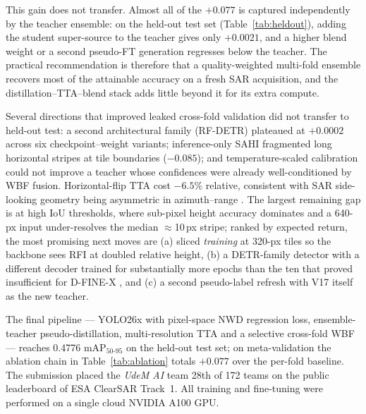 \documentclass{article}
\begin{document}
This gain does not transfer. Almost all of the $+0.077$ is captured
independently by the teacher ensemble: on the held-out test set
(Table~\ref{tab:heldout}), adding the student super-source to the
teacher gives only $+0.0021$, and a higher blend weight or a second
pseudo-FT generation regresses below the teacher. The practical
recommendation is therefore that a quality-weighted multi-fold ensemble
recovers most of the attainable accuracy on a fresh SAR acquisition,
and the distillation--TTA--blend stack adds little beyond it for its
extra compute.

Several directions that improved leaked cross-fold validation did
not transfer to held-out test: a second architectural family (RF-DETR)
plateaued at $+0.0002$ across six checkpoint--weight variants;
inference-only SAHI
fragmented long horizontal stripes at tile boundaries ($-0.085$); and
temperature-scaled calibration could not improve a teacher whose
confidences were already well-conditioned by WBF fusion.
Horizontal-flip TTA cost $-6.5\%$ relative, consistent with SAR
side-looking geometry being asymmetric in azimuth--range
\cite{oliver2004sar}. The largest remaining gap is at high IoU
thresholds, where sub-pixel height accuracy dominates and a 640-px
input under-resolves the median $\approx$10\,px stripe; ranked by
expected return, the most promising next moves are (a) sliced
\emph{training} at 320-px tiles so the backbone sees RFI at doubled
relative height, (b) a DETR-family detector with a different decoder
trained for substantially more epochs than the ten that proved
insufficient for D-FINE-X \cite{huang2024deim}, and (c) a second
pseudo-label refresh with V17 itself as the new teacher.

The final pipeline --- YOLO26x with pixel-space NWD regression loss,
ensemble-teacher pseudo-distillation, multi-resolution TTA and a
selective cross-fold WBF --- reaches 0.4776 mAP$_{50\text{-}95}$ on
the held-out test set; on meta-validation the ablation chain in
Table~\ref{tab:ablation} totals $+0.077$ over the per-fold baseline.
The submission placed the \emph{UdeM AI} team 28th of 172 teams on
the public leaderboard of ESA ClearSAR Track~1. All training and fine-tuning were performed on
a single cloud NVIDIA A100 GPU.

\vfill\pagebreak
\end{document}
